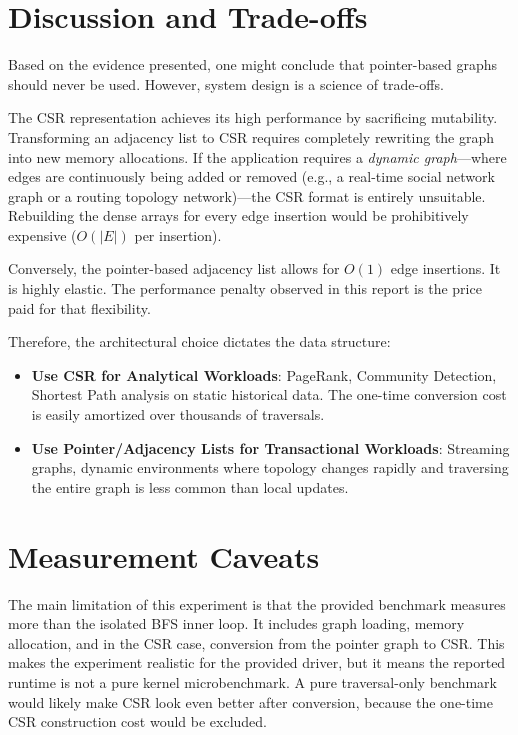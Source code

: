 \documentclass[11pt]{article}
\begin{document}
\section{Discussion and Trade-offs}

Based on the evidence presented, one might conclude that pointer-based graphs should never be used. However, system design is a science of trade-offs. 

The CSR representation achieves its high performance by sacrificing mutability. Transforming an adjacency list to CSR requires completely rewriting the graph into new memory allocations. If the application requires a \textit{dynamic graph}---where edges are continuously being added or removed (e.g., a real-time social network graph or a routing topology network)---the CSR format is entirely unsuitable. Rebuilding the dense arrays for every edge insertion would be prohibitively expensive ($O(|E|)$ per insertion).

Conversely, the pointer-based adjacency list allows for $O(1)$ edge insertions. It is highly elastic. The performance penalty observed in this report is the price paid for that flexibility.

Therefore, the architectural choice dictates the data structure:
\begin{itemize}
    \item \textbf{Use CSR for Analytical Workloads}: PageRank, Community Detection, Shortest Path analysis on static historical data. The one-time conversion cost is easily amortized over thousands of traversals.
    \item \textbf{Use Pointer/Adjacency Lists for Transactional Workloads}: Streaming graphs, dynamic environments where topology changes rapidly and traversing the entire graph is less common than local updates.
\end{itemize}

\section{Measurement Caveats}

The main limitation of this experiment is that the provided benchmark measures more than the isolated BFS inner loop. It includes graph loading, memory allocation, and in the CSR case, conversion from the pointer graph to CSR. This makes the experiment realistic for the provided driver, but it means the reported runtime is not a pure kernel microbenchmark. A pure traversal-only benchmark would likely make CSR look even better after conversion, because the one-time CSR construction cost would be excluded.
\end{document}
